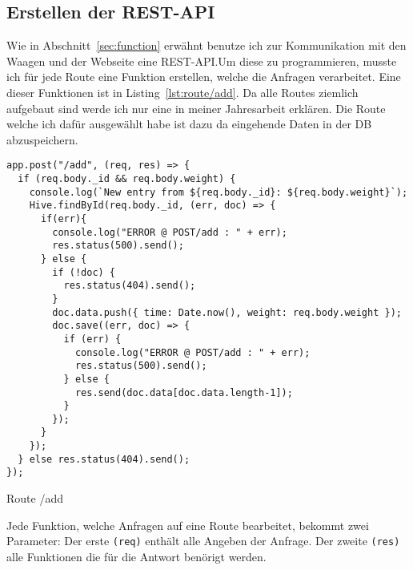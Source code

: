 \documentclass[a4paper, ngerman, 11pt]{scrartcl}
\newcommand{\js}[1]{\texttt{#1}}
\begin{document}
\subsection{Erstellen der REST-API} %

Wie in Abschnitt~\autoref{sec:function} erwähnt benutze ich zur Kommunikation mit den Waagen und der Webseite eine REST-API.\@ Um diese zu programmieren, musste ich für jede Route eine Funktion erstellen, welche die Anfragen verarbeitet. Eine dieser Funktionen ist in Listing~\ref{lst:route/add}. Da alle Routes ziemlich aufgebaut sind werde ich nur eine in meiner Jahresarbeit erklären. Die Route welche ich dafür ausgewählt habe ist dazu da eingehende Daten in der DB abzuspeichern. 
\begin{listing}[ht]
\begin{verbatim}
app.post("/add", (req, res) => {
  if (req.body._id && req.body.weight) {
    console.log(`New entry from ${req.body._id}: ${req.body.weight}`);
    Hive.findById(req.body._id, (err, doc) => {
      if(err){
        console.log("ERROR @ POST/add : " + err);
        res.status(500).send();
      } else {
        if (!doc) {
          res.status(404).send();
        }
        doc.data.push({ time: Date.now(), weight: req.body.weight });
        doc.save((err, doc) => {
          if (err) {
            console.log("ERROR @ POST/add : " + err);
            res.status(500).send();
          } else {
            res.send(doc.data[doc.data.length-1]);
          }
        });
      }
    });
  } else res.status(404).send();
});
\end{verbatim}
\caption{Route /add}\label{lst:route/add}
\end{listing}

Jede Funktion, welche Anfragen auf eine Route bearbeitet, bekommt zwei Parameter: Der erste \js{(req)} enthält alle Angeben der Anfrage. Der zweite \js{(res)} alle Funktionen die für die Antwort benörigt werden.
\end{document}
